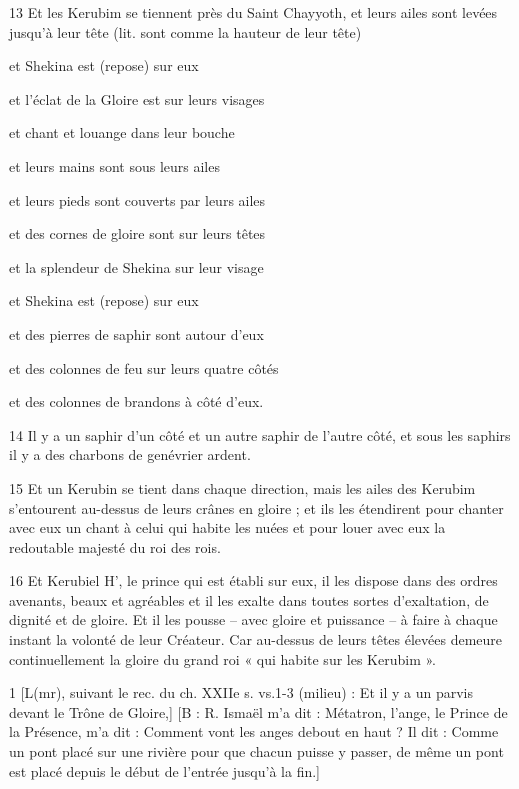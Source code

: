 \par 13 Et les Kerubim se tiennent près du Saint Chayyoth, et leurs ailes sont levées jusqu'à leur tête (lit. sont comme la hauteur de leur tête)
\par et Shekina est (repose) sur eux
\par et l'éclat de la Gloire est sur leurs visages
\par et chant et louange dans leur bouche
\par et leurs mains sont sous leurs ailes
\par et leurs pieds sont couverts par leurs ailes
\par et des cornes de gloire sont sur leurs têtes
\par et la splendeur de Shekina sur leur visage
\par et Shekina est (repose) sur eux
\par et des pierres de saphir sont autour d'eux
\par et des colonnes de feu sur leurs quatre côtés
\par et des colonnes de brandons à côté d'eux.

\par 14 Il y a un saphir d'un côté et un autre saphir de l'autre côté, et sous les saphirs il y a des charbons de genévrier ardent.

\par 15 Et un Kerubin se tient dans chaque direction, mais les ailes des Kerubim s'entourent au-dessus de leurs crânes en gloire ; et ils les étendirent pour chanter avec eux un chant à celui qui habite les nuées et pour louer avec eux la redoutable majesté du roi des rois.

\par 16 Et Kerubiel H', le prince qui est établi sur eux, il les dispose dans des ordres avenants, beaux et agréables et il les exalte dans toutes sortes d'exaltation, de dignité et de gloire. Et il les pousse – avec gloire et puissance – à faire à chaque instant la volonté de leur Créateur. Car au-dessus de leurs têtes élevées demeure continuellement la gloire du grand roi « qui habite sur les Kerubim ».


\par 1 [L(mr), suivant le rec. du ch. XXIIe s. vs.1-3 (milieu) : Et il y a un parvis devant le Trône de Gloire,] [B : R. Ismaël m'a dit : Métatron, l'ange, le Prince de la Présence, m'a dit : Comment vont les anges debout en haut ? Il dit : Comme un pont placé sur une rivière pour que chacun puisse y passer, de même un pont est placé depuis le début de l'entrée jusqu'à la fin.]

